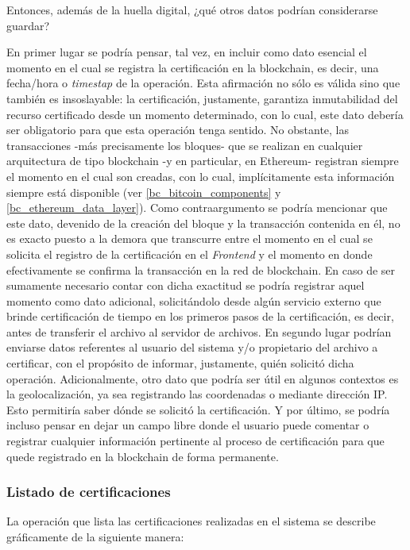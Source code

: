 Entonces, además de la huella digital, ¿qué otros datos podrían considerarse guardar?

En primer lugar se podría pensar, tal vez, en incluir como dato esencial el momento en el cual se registra la certificación en la blockchain, es decir, una fecha/hora o \textit{timestap} de la operación. Esta afirmación no sólo es válida sino que también es insoslayable: la certificación, justamente, garantiza inmutabilidad del recurso certificado desde un momento determinado, con lo cual, este dato debería ser obligatorio para que esta operación tenga sentido. No obstante, las transacciones -más precisamente los bloques- que se realizan en cualquier arquitectura de tipo blockchain -y en particular, en Ethereum- registran siempre el momento en el cual son creadas, con lo cual, implícitamente esta información siempre está disponible (ver \ref{bc_bitcoin_components} y \ref{bc_ethereum_data_layer}). Como contraargumento se podría mencionar que este dato, devenido de la creación del bloque y la transacción contenida en él, no es exacto puesto a la demora que transcurre entre el momento en el cual se solicita el registro de la certificación en el \textit{Frontend} y el momento en donde efectivamente se confirma la transacción en la red de blockchain. En caso de ser sumamente necesario contar con dicha exactitud se podría registrar aquel momento como dato adicional, solicitándolo desde algún servicio externo que brinde certificación de tiempo en los primeros pasos de la certificación, es decir, antes de transferir el archivo al servidor de archivos.
En segundo lugar podrían enviarse datos referentes al usuario del sistema y/o propietario del archivo a certificar, con el propósito de informar, justamente, quién solicitó dicha operación.
Adicionalmente, otro dato que podría ser útil en algunos contextos es la geolocalización, ya sea registrando las coordenadas o mediante dirección IP. Esto permitiría saber dónde se solicitó la certificación.
Y por último, se podría incluso pensar en dejar un campo libre donde el usuario puede comentar o registrar cualquier información pertinente al proceso de certificación para que quede registrado en la blockchain de forma permanente.

\subsubsection{Listado de certificaciones}
\label{listado_certificaciones}

La operación que lista las certificaciones realizadas en el sistema se describe gráficamente de la siguiente manera:


